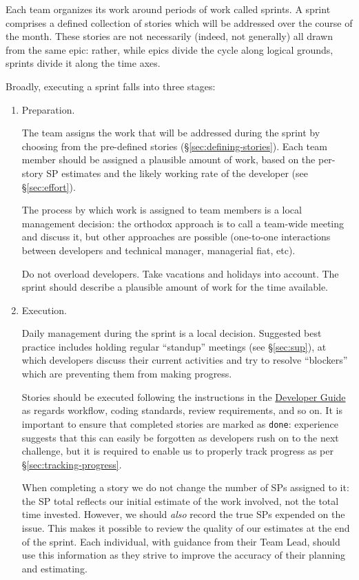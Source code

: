 Each team organizes its work around periods of work called sprints.
A sprint comprises a defined collection of stories which will be addressed over the course of the month.
These stories are not necessarily (indeed, not generally) all drawn from the same \gls{epic}: rather, while \glspl{epic} divide the \gls{cycle} along logical grounds, sprints divide it along the time axes.

Broadly, executing a sprint falls into three stages:

\begin{enumerate}
\item Preparation.

  The team assigns the work that will be addressed during the sprint by choosing from the pre-defined stories (\S\ref{sec:defining-stories}).
  Each team member should be assigned a plausible amount of work, based on the per-\gls{story} \gls{SP} estimates and the likely working rate of the developer (see \S\ref{sec:effort}).

  The process by which work is assigned to team members is a local
  management decision: the orthodox approach is to call a team-wide
  meeting and discuss it, but other approaches are possible (one-to-one
  interactions between developers and technical manager, managerial
  fiat, etc).

  Do not overload developers. Take vacations and holidays into account.
  The sprint should describe a plausible amount of work for the time
  available.
\item Execution.

  Daily management during the sprint is a local decision. Suggested best
  practice includes holding regular ``standup'' meetings (see \S\ref{sec:sup}), at which
  developers discuss their current activities and try to resolve
  ``blockers'' which are preventing them from making progress.

  Stories should be executed following the instructions in the
  \href{http://developer.lsst.io/}{Developer Guide} as regards workflow,
  coding standards, review requirements, and so on. It is important to
  ensure that completed stories are marked as \texttt{done}:
  experience suggests that this can easily be forgotten as developers
  rush on to the next challenge, but it is required to enable us to
  properly track progress as per \S\ref{sec:tracking-progress}.

  When completing a \gls{story} we do not change the number of \glspl{SP} assigned to
  it: the \gls{SP} total reflects our initial estimate of the work involved,
  not the total time invested.
  However, we should \textit{also} record the true \glspl{SP} expended on the issue.
  This makes it possible to review the quality of our estimates at the end of the sprint.
  Each individual, with guidance from their Team Lead, should use this information as they strive to improve the accuracy of their planning and estimating.


\end{enumerate}
